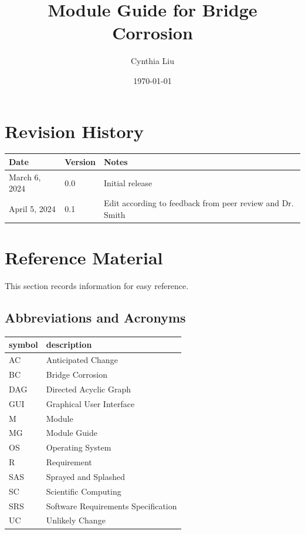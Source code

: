 \documentclass[12pt, titlepage]{article}
\begin{document}
\title{Module Guide for Bridge Corrosion} 
\author{Cynthia Liu}
\date{\today}

\maketitle


\section{Revision History}

\begin{tabularx}{\textwidth}{p{3cm}p{2cm}X}
\toprule {\bf Date} & {\bf Version} & {\bf Notes}\\
\midrule
March 6, 2024 & 0.0 & Initial release\\
April 5, 2024 & 0.1 & Edit according to feedback from peer review and Dr. Smith\\
\bottomrule
\end{tabularx}

\newpage

\section{Reference Material}

This section records information for easy reference.

\subsection{Abbreviations and Acronyms}

\renewcommand{\arraystretch}{1.2}
\begin{tabular}{l l} 
  \toprule		
  \textbf{symbol} & \textbf{description}\\
  \midrule 
  AC & Anticipated Change\\
  BC & Bridge Corrosion\\
  DAG & Directed Acyclic Graph \\
  GUI & Graphical User Interface \\
  M & Module \\
  MG & Module Guide \\
  OS & Operating System \\
  R & Requirement\\
  SAS & Sprayed and Splashed \\
  SC & Scientific Computing \\
  SRS & Software Requirements Specification\\
  UC & Unlikely Change \\
  \bottomrule
\end{tabular}\\
\end{document}
